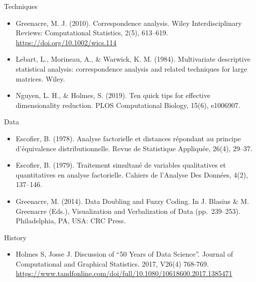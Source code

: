\documentclass[
  ignorenonframetext,
]{beamer}
\providecommand{\tightlist}{%
  \setlength{\itemsep}{0pt}\setlength{\parskip}{0pt}}
\begin{document}
\begin{frame}{Techniques}
\protect\hypertarget{techniques-1}{}

\begin{itemize}[<+->]
\item
  Greenacre, M. J. (2010). Correspondence analysis. Wiley
  Interdisciplinary Reviews: Computational Statistics, 2(5), 613--619.
  \url{https://doi.org/10.1002/wics.114}
\item
  Lebart, L., Morineau, A., \& Warwick, K. M. (1984). Multivariate
  descriptive statistical analysis: correspondence analysis and related
  techniques for large matrices. Wiley.
\item
  Nguyen, L. H., \& Holmes, S. (2019). Ten quick tips for effective
  dimensionality reduction. PLOS Computational Biology, 15(6), e1006907.
\end{itemize}

\end{frame}

\begin{frame}{Data}
\protect\hypertarget{data}{}

\begin{itemize}[<+->]
\item
  Escofier, B. (1978). Analyse factorielle et distances répondant au
  principe d'équivalence distributionnelle. Revue de Statistique
  Appliquée, 26(4), 29--37.
\item
  Escofier, B. (1979). Traitement simultané de variables qualitatives et
  quantitatives en analyse factorielle. Cahiers de l'Analyse Des
  Données, 4(2), 137--146.
\item
  Greenacre, M. (2014). Data Doubling and Fuzzy Coding. In J. Blasius \&
  M. Greenacre (Eds.), Visualization and Verbalization of Data
  (pp.~239--253). Philadelphia, PA, USA: CRC Press.
\end{itemize}

\end{frame}

\begin{frame}{History}
\protect\hypertarget{history-1}{}

\begin{itemize}[<+->]
\tightlist
\item
  Holmes S, Josse J. Discussion of ``50 Years of Data Science''. Journal
  of Computational and Graphical Statistics. 2017, V26(4) 768-769.
  \url{https://www.tandfonline.com/doi/full/10.1080/10618600.2017.1385471}
\end{itemize}

\end{frame}
\end{document}
